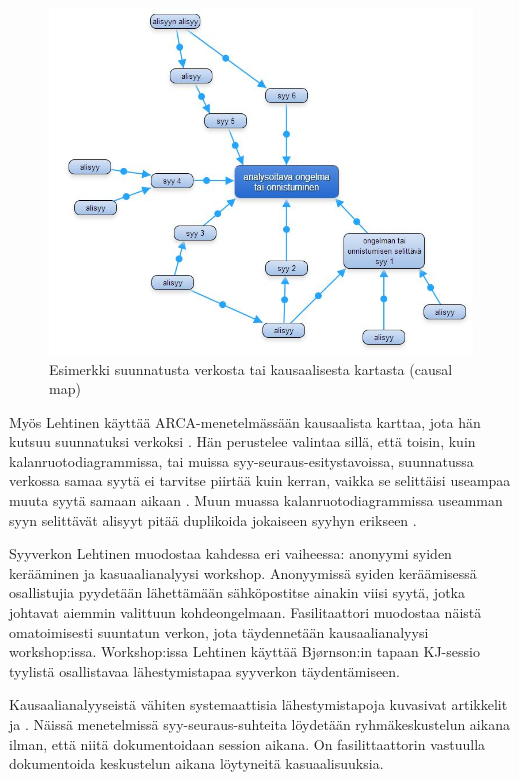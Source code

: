 \begin{figure}[ht!]
\centering
\includegraphics[width=150mm]{suunnattu_verkko_esimerkki_relaatioilla.jpg}
\caption{Esimerkki suunnatusta verkosta tai kausaalisesta kartasta (causal map)}
\label{verkko_ex}
\end{figure}

Myös Lehtinen käyttää ARCA-menetelmässään kausaalista karttaa, jota hän kutsuu suunnatuksi verkoksi \citep{Lehtinen2011}. Hän perustelee valintaa sillä, että toisin, kuin kalanruotodiagrammissa, tai muissa syy-seuraus-esitystavoissa, suunnatussa verkossa samaa syytä ei tarvitse piirtää kuin kerran, vaikka se selittäisi useampaa muuta syytä samaan aikaan \citep{Lehtinen2011}. Muun muassa kalanruotodiagrammissa useamman syyn selittävät alisyyt pitää duplikoida jokaiseen syyhyn erikseen \citep{Lehtinen2011}. 

Syyverkon Lehtinen muodostaa kahdessa eri vaiheessa: anonyymi syiden kerääminen ja kasuaalianalyysi workshop. Anonyymissä syiden keräämisessä osallistujia pyydetään lähettämään sähköpostitse ainakin viisi syytä, jotka johtavat aiemmin valittuun kohdeongelmaan. Fasilitaattori muodostaa näistä omatoimisesti suuntatun verkon, jota täydennetään kausaalianalyysi workshop:issa. Workshop:issa Lehtinen käyttää Bj{\o}rnson:in tapaan KJ-sessio tyylistä osallistavaa lähestymistapaa syyverkon täydentämiseen. \citep{Lehtinen2011}

Kausaalianalyyseistä vähiten systemaattisia lähestymistapoja kuvasivat artikkelit \citep{karlsson2006case} ja \citep{staalhane2003post}. Näissä menetelmissä syy-seuraus-suhteita löydetään ryhmäkeskustelun aikana ilman, että niitä dokumentoidaan session aikana. On fasilittaattorin vastuulla dokumentoida keskustelun aikana löytyneitä kasuaalisuuksia.

